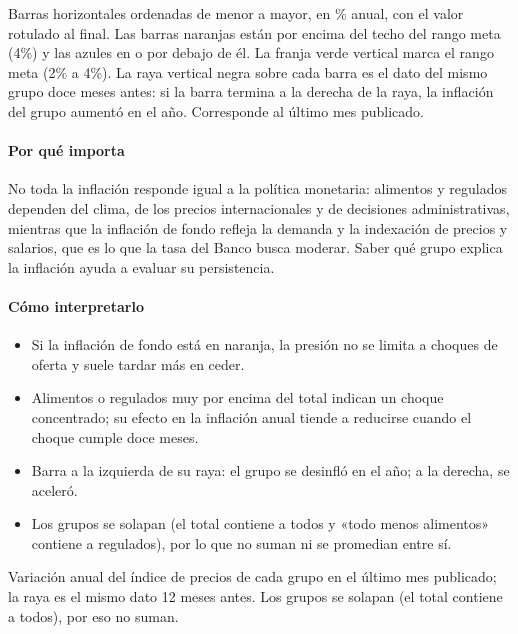\begin{leer}
Barras horizontales ordenadas de menor a mayor, en \% anual, con el valor rotulado al final. Las barras naranjas están por encima del techo del rango meta (4\%) y las azules en o por debajo de él. La franja verde vertical marca el rango meta (2\% a 4\%). La raya vertical negra sobre cada barra es el dato del mismo grupo doce meses antes: si la barra termina a la derecha de la raya, la inflación del grupo aumentó en el año. Corresponde al último mes publicado.
\end{leer}

\paragraph{Por qué importa}
No toda la inflación responde igual a la política monetaria: alimentos y regulados dependen del clima, de los precios internacionales y de decisiones administrativas, mientras que la inflación de fondo refleja la demanda y la indexación de precios y salarios, que es lo que la tasa del Banco busca moderar. Saber qué grupo explica la inflación ayuda a evaluar su persistencia.

\paragraph{Cómo interpretarlo}
\begin{itemize}
\item Si la inflación de fondo está en naranja, la presión no se limita a choques de oferta y suele tardar más en ceder.
\item Alimentos o regulados muy por encima del total indican un choque concentrado; su efecto en la inflación anual tiende a reducirse cuando el choque cumple doce meses.
\item Barra a la izquierda de su raya: el grupo se desinfló en el año; a la derecha, se aceleró.
\item Los grupos se solapan (el total contiene a todos y «todo menos alimentos» contiene a regulados), por lo que no suman ni se promedian entre sí.
\end{itemize}
\begin{formulas}[Fórmulas]
\end{formulas}
\begin{metodo}[Metodología]
Variación anual del índice de precios de cada grupo en el último mes publicado; la raya es el mismo dato 12 meses antes. Los grupos se solapan (el total contiene a todos), por eso no suman.
\par{}
\end{metodo}

